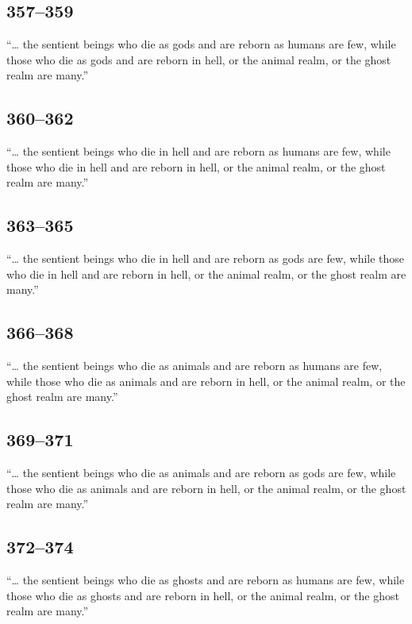 \documentclass[12pt,openany]{book}%
\begin{document}
\subsection*{357–359 }

“… the sentient beings who die as gods and are reborn as humans are few, while those who die as gods and are reborn in hell, or the animal realm, or the ghost realm are many.” 

\subsection*{360–362 }

“… the sentient beings who die in hell and are reborn as humans are few, while those who die in hell and are reborn in hell, or the animal realm, or the ghost realm are many.” 

\subsection*{363–365 }

“… the sentient beings who die in hell and are reborn as gods are few, while those who die in hell and are reborn in hell, or the animal realm, or the ghost realm are many.” 

\subsection*{366–368 }

“… the sentient beings who die as animals and are reborn as humans are few, while those who die as animals and are reborn in hell, or the animal realm, or the ghost realm are many.” 

\subsection*{369–371 }

“… the sentient beings who die as animals and are reborn as gods are few, while those who die as animals and are reborn in hell, or the animal realm, or the ghost realm are many.” 

\subsection*{372–374 }

“… the sentient beings who die as ghosts and are reborn as humans are few, while those who die as ghosts and are reborn in hell, or the animal realm, or the ghost realm are many.” 
\end{document}

